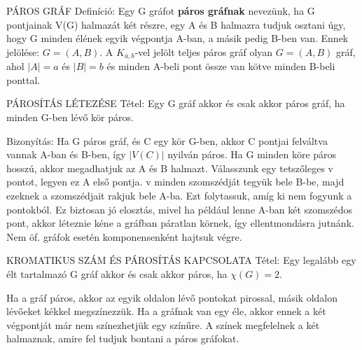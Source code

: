 \documentclass[]{article}
\begin{document}
\begin{shaded}
PÁROS GRÁF Definíció: Egy G gráfot \textbf{páros gráfnak} nevezünk, ha G pontjainak V(G) halmazát két részre, egy A és B halmazra tudjuk osztani úgy, hogy G minden élének egyik végpontja A-ban, a másik pedig B-ben van. Ennek jelölése: $G = (A,B)$. A $K_{a,b}$-vel jelölt teljes páros gráf olyan $G=(A,B)$ gráf, ahol $|A| = a$ és $|B| = b$ és minden A-beli pont össze van kötve minden B-beli ponttal.
\end{shaded}
\begin{framed}
PÁROSÍTÁS LÉTEZÉSE Tétel: Egy G gráf akkor és csak akkor páros gráf, ha minden G-ben lévő kör páros.
\end{framed}
\begin{leftbar}
Bizonyítás: Ha G páros gráf, és C egy kör G-ben, akkor C pontjai felváltva vannak A-ban és B-ben, így $|V(C)|$ nyilván páros. Ha G minden köre páros hosszú, akkor megadhatjuk az A és B halmazt. Válasszunk egy tetszőleges v pontot, legyen ez A első pontja.  v minden szomszédját tegyük bele B-be, majd ezeknek a szomszédjait rakjuk bele A-ba. Ezt folytassuk, amíg ki nem fogyunk a pontokból. Ez biztosan jó elosztás, mivel ha például lenne A-ban két szomszédos pont, akkor léteznie kéne a gráfban páratlan körnek, így ellentmondásra jutnánk. Nem öf. gráfok esetén komponensenként hajtsuk végre.
\end{leftbar}
\begin{framed}
KROMATIKUS SZÁM ÉS PÁROSÍTÁS KAPCSOLATA Tétel: Egy legalább egy élt tartalmazó G gráf akkor és csak akkor páros, ha $\chi(G) = 2$.
\end{framed}
\begin{leftbar}
Ha a gráf páros, akkor az egyik oldalon lévő pontokat pirossal, másik oldalon lévőeket kékkel megszínezzük. Ha a gráfnak van egy éle, akkor ennek a két végpontját már nem színezhetjük egy színűre. A színek megfelelnek a két halmaznak, amire fel tudjuk bontani a páros gráfokat.
\end{leftbar}
\end{document}
